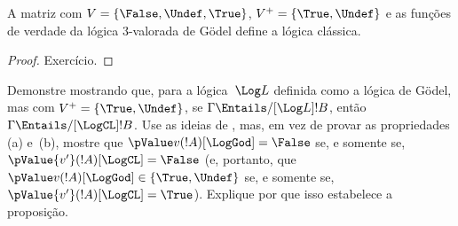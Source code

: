 \documentclass[../../../include/open-logic-section]{subfiles}
\begin{document}
\begin{prop}
  A matriz com $V = \{\False, \Undef,\True\}$, $V^+=\{\True,
  \Undef\}$ e as funções de verdade da lógica $3$-valorada de G\"odel
  define a lógica clássica.
\end{prop}

\begin{proof}
  Exercício. 
\end{proof}

\begin{prob}
Demonstre  mostrando que, para a
  lógica~$\Log L$ definida como a lógica de G\"odel, mas com
  $V^+=\{\True,\Undef\}$, se $\Gamma \Entails/[\Log L] !B$, então
  $\Gamma \Entails/[\LogCL] !B$. Use as ideias de
  , mas, em vez de provar
  as propriedades (a) e~(b), mostre que $\pValue v(!A)[\LogGod] = \False$
  se, e somente se, $\pValue {v'}(!A)[\LogCL] = \False$ (e, portanto, que $\pValue
  v(!A)[\LogGod] \in \{\True,\Undef\}$ se, e somente se, $\pValue {v'}(!A)[\LogCL] =
  \True$). Explique por que isso estabelece a proposição.
\end{prob}
\end{document}
